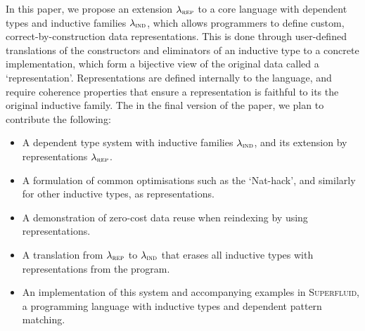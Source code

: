 In this paper, we propose an extension $\lambda_{\textsc{rep}}$ to a core language with
dependent types and inductive families $\lambda_{\textsc{ind}}$, which allows programmers to
define custom, correct-by-construction data representations. This is done
through user-defined translations of the constructors and eliminators of an
inductive type to a concrete implementation, which form a bijective view of the
original data called a `representation'. Representations are defined internally
to the language, and require coherence properties that ensure a representation
is faithful to its the original inductive family. The in the final version of
the paper, we plan to contribute the following:
\begin{itemize}
  \item A dependent type system with inductive families $\lambda_{\textsc{ind}}$,
    and its extension by representations $\lambda_{\textsc{rep}}$.
  \item A formulation of common optimisations such as the `Nat-hack', and
      similarly for other inductive types, as representations.
  \item A demonstration of zero-cost data reuse when reindexing by using representations.
  \item A translation from $\lambda_{\textsc{rep}}$ to $\lambda_{\textsc{ind}}$ that erases all
    inductive types with representations from the program.
  \item An implementation of this system and accompanying examples in
    \textsc{Superfluid}, a programming language with inductive types and
    dependent pattern matching.
\end{itemize}


